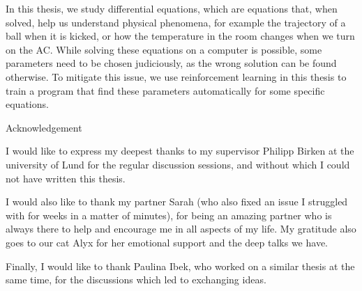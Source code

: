 In this thesis, we study differential equations, which are equations that, when solved, help us understand physical phenomena, for example the trajectory of a ball when it is kicked, or how the temperature in the room changes when we turn on the AC. While solving these equations on a computer is possible, some parameters need to be chosen judiciously, as the wrong solution can be found otherwise. To mitigate this issue, we use reinforcement learning in this thesis to train a program that find these parameters automatically for some specific equations.


\newpage



\begin{center}
\huge{Acknowledgement}
\end{center}

\vspace*{\baselineskip}

I would like to express my deepest thanks to my supervisor Philipp Birken at the university of Lund for the regular discussion sessions, and without which I could not have written this thesis.

I would also like to thank my partner Sarah (who also fixed an issue I struggled with for weeks in a matter of minutes), for being an amazing partner who is always there to help and encourage me in all aspects of my life. My gratitude also goes to our cat Alyx for her emotional support and the deep talks we have. 

Finally, I would like to thank Paulina Ibek, who worked on a similar thesis at the same time, for the discussions which led to exchanging ideas.

\newpage

